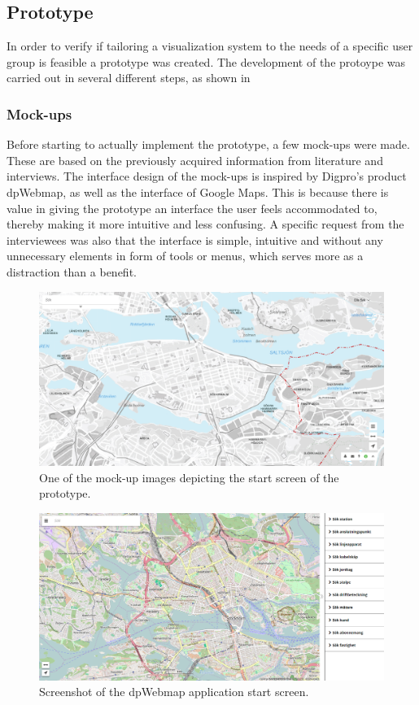 \documentclass[a4paper,12pt,titlepage]{article}
\begin{document}
\subsection{Prototype}

In order to verify if tailoring a visualization system to the needs of a specific user group is feasible a prototype was created. The development of the protoype was carried out in several different steps, as shown in 

\subsubsection{Mock-ups}

Before starting to actually implement the prototype, a few mock-ups were made. These are based on the previously acquired information from literature and interviews. The interface design of the mock-ups is inspired by Digpro's product dpWebmap, as well as the interface of Google Maps. This is because there is value in giving the prototype an interface the user feels accommodated to, thereby making it more intuitive and less confusing. A specific request from the interviewees was also that the interface is simple, intuitive and without any unnecessary elements in form of tools or menus, which serves more as a distraction than a benefit.

\begin{figure}[H]
    \centering
        \includegraphics[width=15cm]{mockup.jpg}
    \caption{One of the mock-up images depicting the start screen of the prototype.}  
    \label{fig:Mockup}
\end{figure}


\begin{figure}[H]
    \centering
        \includegraphics[width=15cm]{dpwebmap.png}
    \caption{Screenshot of the dpWebmap application start screen.}  
    \label{fig:dpwebmap}
\end{figure}
\end{document}
